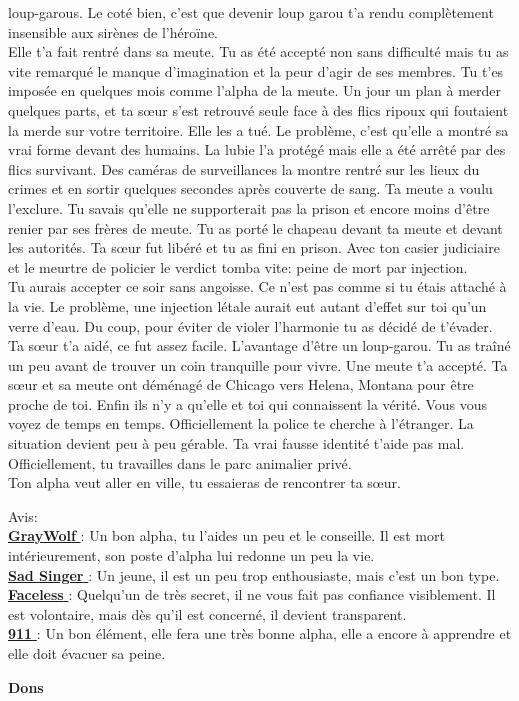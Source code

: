 \documentclass[oneside,12pt]{book}
\newcommand{\Glen}{\textbf{GrayWolf} }
\newcommand{\Mathew}{\textbf{Sad Singer} }
\newcommand{\Andy}{\textbf{Faceless} }
\newcommand{\Kelly}{\textbf{911} }
\begin{document}
\begin{flushleft}
\begin{description}
{{loup-garous. Le coté bien, c'est que devenir loup garou t'a rendu complètement insensible aux sirènes de l'héroïne. \\
Elle t'a fait rentré dans sa meute. Tu as été accepté non sans difficulté mais tu as vite remarqué le manque d'imagination et la peur d'agir de ses membres. Tu t'es imposée en quelques mois comme l'alpha de la meute.
Un jour un plan à merder quelques parts, et ta sœur s'est retrouvé seule face à des flics ripoux qui foutaient la merde sur votre territoire. Elle les a tué. Le problème, c'est qu'elle a montré sa vrai forme devant des humains. La lubie l'a protégé mais elle a été arrêté par des flics survivant. Des caméras de surveillances la montre rentré sur les lieux du crimes et en sortir quelques secondes après couverte de sang.
Ta meute a voulu l'exclure. Tu savais qu'elle ne supporterait pas la prison et encore moins d'être renier par ses frères de meute. Tu as porté le chapeau devant ta meute et devant les autorités.
Ta sœur fut libéré et tu as fini en prison. Avec ton casier judiciaire et le meurtre de policier le verdict tomba vite: peine de mort par injection. \\
Tu aurais accepter ce soir sans angoisse. Ce n'est pas comme si tu étais attaché à la vie. Le problème, une injection létale aurait eut autant d'effet sur toi qu'un verre d'eau. Du coup, pour éviter de violer l'harmonie tu as décidé de t'évader. Ta sœur t'a aidé, ce fut assez facile. L'avantage d'être un loup-garou. Tu as traîné un peu avant de trouver un coin tranquille pour vivre. Une meute t'a accepté. Ta sœur et sa meute ont déménagé de Chicago vers Helena, Montana pour être proche de toi. Enfin ils n'y a qu'elle et toi qui connaissent la vérité. Vous vous voyez de temps en temps. Officiellement la police te cherche à l'étranger. La situation devient peu à peu gérable. Ta vrai fausse identité t'aide pas mal. Officiellement, tu travailles dans le parc animalier privé.\\
Ton alpha veut aller en ville, tu essaieras de rencontrer ta sœur.}

Avis:\\
\underline{\Glen} :  Un bon alpha, tu l'aides un peu et le conseille. Il est mort intérieurement, son poste d'alpha lui redonne un peu la vie.\\
\underline{\Mathew} : Un jeune, il est un peu trop enthousiaste, mais c'est un bon type.\\
\underline{\Andy} : Quelqu'un de très secret, il ne vous fait pas confiance visiblement. Il est volontaire, mais dès qu'il est concerné, il devient transparent.\\
\underline{\Kelly} : Un bon élément, elle fera une très bonne alpha, elle a encore à apprendre et elle doit évacuer sa peine.\\
}
\end{description}
\clearpage
\textbf{\large Dons}
\vspace{0.5cm}


\end{flushleft}
\end{document}
